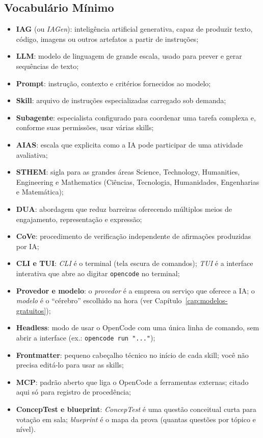 \subsection{Vocabul{\'a}rio M{\'i}nimo}

\begin{itemize}
  \item \textbf{IAG} (ou \emph{IAGen}): intelig{\^e}ncia artificial generativa, capaz de produzir texto, c{\'o}digo, imagens ou outros artefatos a partir de instru{\c c}{\~o}es;
  \item \textbf{LLM}: modelo de linguagem de grande escala, usado para prever e gerar sequ{\^e}ncias de texto;
  \item \textbf{Prompt}: instru{\c c}{\~a}o, contexto e crit{\'e}rios fornecidos ao modelo;
  \item \textbf{Skill}: arquivo de instru{\c c}{\~o}es especializadas carregado sob demanda;
  \item \textbf{Subagente}: especialista configurado para coordenar uma tarefa complexa e, conforme suas permiss{\~o}es, usar v{\'a}rias skills;
  \item \textbf{AIAS}: escala que explicita como a IA pode participar de uma atividade avaliativa;
  \item \textbf{STHEM}: sigla para as grandes {\'a}reas Science, Technology, Humanities, Engineering e Mathematics (Ci{\^e}ncias, Tecnologia, Humanidades, Engenharias e Matem{\'a}tica);
  \item \textbf{DUA}: abordagem que reduz barreiras oferecendo m{\'u}ltiplos meios de engajamento, representa{\c c}{\~a}o e express{\~a}o;
  \item \textbf{CoVe}: procedimento de verifica{\c c}{\~a}o independente de afirma{\c c}{\~o}es produzidas por IA;
  \item \textbf{CLI e TUI}: \emph{CLI} {\'e} o terminal (tela escura de comandos); \emph{TUI} {\'e} a interface interativa que abre ao digitar \texttt{opencode} no terminal;
  \item \textbf{Provedor e modelo}: o \emph{provedor} {\'e} a empresa ou servi{\c c}o que oferece a IA; o \emph{modelo} {\'e} o ``c{\'e}rebro'' escolhido na hora (ver Cap{\'i}tulo~\ref{cap:modelos-gratuitos});
  \item \textbf{Headless}: modo de usar o OpenCode com uma {\'u}nica linha de comando, sem abrir a interface (ex.: \texttt{opencode run "..."});
  \item \textbf{Frontmatter}: pequeno cabe{\c c}alho t{\'e}cnico no in{\'i}cio de cada skill; voc{\^e} n{\~a}o precisa edit{\'a}-lo para usar as skills;
  \item \textbf{MCP}: padr{\~a}o aberto que liga o OpenCode a ferramentas externas; citado aqui s{\'o} para registro de proced{\^e}ncia;
  \item \textbf{ConcepTest e blueprint}: \emph{ConcepTest} {\'e} uma quest{\~a}o conceitual curta para vota{\c c}{\~a}o em sala; \emph{blueprint} {\'e} o mapa da prova (quantas quest{\~o}es por t{\'o}pico e n{\'i}vel).
\end{itemize}

